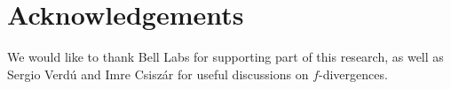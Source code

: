 \documentclass[11pt]{article}
\newcommand{\Enote}[1]{\begin{center}\fbox{\begin{minipage}{35em}
                        {{\bf Emmanuel Note:} {#1}} \end{minipage}}\end{center}}
\newcommand{\1}{\mathbb{1}}
\begin{document}

\section*{Acknowledgements}
We would like to thank Bell Labs for supporting part of this research, as well as Sergio Verd\'u and Imre Csisz\'ar for useful discussions on $f$-divergences. 





\end{document}
